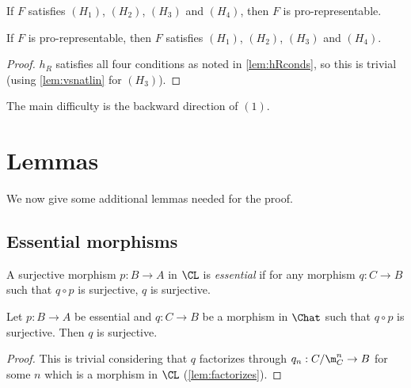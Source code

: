 \begin{theorem}
  \label{thm:Schlessinger3}
  \leanok
  If $F$ satisfies $(H_1)$, $(H_2)$, $(H_3)$
  and $(H_4)$, then $F$ is pro-representable.
\end{theorem}

\begin{theorem}
  \label{thm:Schlessinger4}
  \leanok
  If $F$ is pro-representable, then $F$ satisfies $(H_1)$, $(H_2)$, $(H_3)$
  and $(H_4)$.
\end{theorem}

\begin{proof}
  \leanok
  $h_R$ satisfies all four conditions as noted in \cref{lem:hRconds},
  so this is trivial
  (using \cref{lem:vsnatlin} for $(H_3)$).
\end{proof}

The main difficulty is the backward direction of $(1)$.

\chapter{Lemmas}
\label{sec:lemmas}

We now give some additional lemmas needed for the proof.

\section{Essential morphisms}

\begin{definition}
  \label{def:IsEssential}
  \leanok
  A surjective morphism $p : B \to A$ in $\CL$ is \emph{essential}
  if for any morphism $q : C \to B$ such that $q \circ p$ is surjective,
  $q$ is surjective.
\end{definition}

\begin{lemma}
  \label{lem:essential_proartin}
  \leanok
  Let $p : B \to A$ be essential and $q : C \to B$ be a morphism in
  $\Chat$ such that $q \circ p$ is surjective. Then $q$ is surjective.
\end{lemma}

\begin{proof}
  \leanok
  This is trivial considering that $q$ factorizes through
  $q_n : C/\m_C^n \to B$ for some $n$ which is a morphism in $\CL$
  (\cref{lem:factorizes}).
\end{proof}

